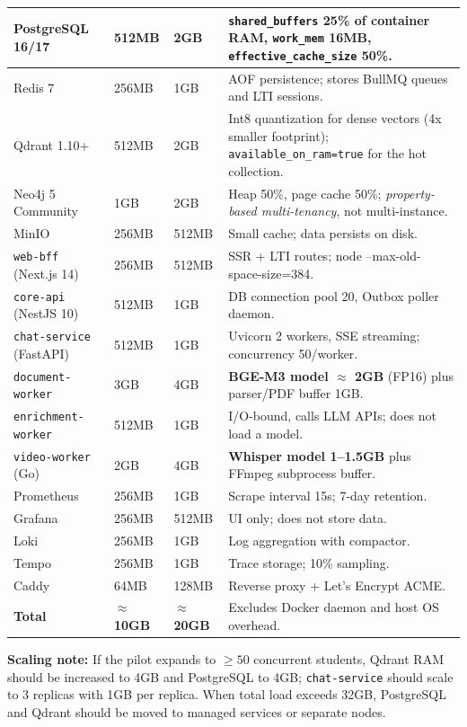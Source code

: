\begin{longtable}{|p{3.7cm}|p{1.5cm}|p{1.8cm}|p{6cm}|}
PostgreSQL 16/17 & 512MB & 2GB
    & \texttt{shared\_buffers} 25\% of container RAM,
      \texttt{work\_mem} 16MB, \texttt{effective\_cache\_size} 50\%. \\
\hline
Redis 7 & 256MB & 1GB
    & AOF persistence; stores BullMQ queues and LTI sessions. \\
\hline
Qdrant 1.10+ & 512MB & 2GB
    & Int8 quantization for dense vectors (4x smaller footprint);
      \texttt{available\_on\_ram=true} for the hot collection. \\
\hline
Neo4j 5 Community & 1GB & 2GB
    & Heap 50\%, page cache 50\%; \textit{property-based multi-tenancy},
      not multi-instance. \\
\hline
MinIO & 256MB & 512MB & Small cache; data persists on disk. \\
\hline
\texttt{web-bff} (Next.js 14) & 256MB & 512MB
    & SSR + LTI routes; node --max-old-space-size=384. \\
\hline
\texttt{core-api} (NestJS 10) & 512MB & 1GB
    & DB connection pool 20, Outbox poller daemon. \\
\hline
\texttt{chat-service} (FastAPI) & 512MB & 1GB
    & Uvicorn 2 workers, SSE streaming; concurrency 50/worker. \\
\hline
\texttt{document-worker} & 3GB & 4GB
    & \textbf{BGE-M3 model $\approx$ 2GB} (FP16) plus parser/PDF buffer
      1GB. \\
\hline
\texttt{enrichment-worker} & 512MB & 1GB
    & I/O-bound, calls LLM APIs; does not load a model. \\
\hline
\texttt{video-worker} (Go) & 2GB & 4GB
    & \textbf{Whisper model 1--1.5GB} plus FFmpeg subprocess buffer. \\
\hline
Prometheus & 256MB & 1GB & Scrape interval 15s; 7-day retention. \\
\hline
Grafana & 256MB & 512MB & UI only; does not store data. \\
\hline
Loki & 256MB & 1GB & Log aggregation with compactor. \\
\hline
Tempo & 256MB & 1GB & Trace storage; 10\% sampling. \\
\hline
Caddy & 64MB & 128MB & Reverse proxy + Let's Encrypt ACME. \\
\hline
\textbf{Total} & \textbf{$\approx$10GB} & \textbf{$\approx$20GB}
    & Excludes Docker daemon and host OS overhead. \\
\hline
\end{longtable}

\textbf{Scaling note:} If the pilot expands to $\geq 50$ concurrent
students, Qdrant RAM should be increased to 4GB and PostgreSQL to 4GB;
\texttt{chat-service} should scale to 3 replicas with 1GB per replica.
When total load exceeds 32GB, PostgreSQL and Qdrant should be moved to
managed services or separate nodes.

